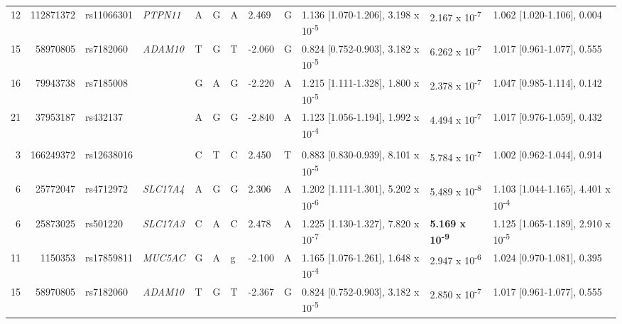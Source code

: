\documentclass[twoside,openright]{report}
\begin{document}
\begin{landscape}
\begin{table}
{\begin{tabular}[t]{rrllllllllll}
\hspace{1em}12 & 112871372 & rs11066301 & \em{PTPN11} & A & G & A & 2.469 & G & 1.136 [1.070-1.206], 3.198 x 10\textsuperscript{-5} & 2.167 x 10\textsuperscript{-7} & 1.062 [1.020-1.106], 0.004\\
\hspace{1em}15 & 58970805 & rs7182060 & \em{ADAM10} & T & G & T & -2.060 & G & 0.824 [0.752-0.903], 3.182 x 10\textsuperscript{-5} & 6.262 x 10\textsuperscript{-7} & 1.017 [0.961-1.077], 0.555\\
\hspace{1em}16 & 79943738 & rs7185008 & \em{} & G & A & G & -2.220 & A & 1.215 [1.111-1.328], 1.800 x 10\textsuperscript{-5} & 2.378 x 10\textsuperscript{-7} & 1.047 [0.985-1.114], 0.142\\
\hspace{1em}21 & 37953187 & rs432137 & \em{} & A & G & G & -2.840 & A & 1.123 [1.056-1.194], 1.992 x 10\textsuperscript{-4} & 4.494 x 10\textsuperscript{-7} & 1.017 [0.976-1.059], 0.432\\
\addlinespace[0.3em]
\multicolumn{12}{l}{\textbf{nSL}}\\
\hspace{1em}3 & 166249372 & rs12638016 & \em{} & C & T & C & 2.450 & T & 0.883 [0.830-0.939], 8.101 x 10\textsuperscript{-5} & 5.784 x 10\textsuperscript{-7} & 1.002 [0.962-1.044], 0.914\\
\hspace{1em}6 & 25772047 & rs4712972 & \em{SLC17A4} & A & G & G & 2.306 & A & 1.202 [1.111-1.301], 5.202 x 10\textsuperscript{-6} & 5.489 x 10\textsuperscript{-8} & 1.103 [1.044-1.165], 4.401 x 10\textsuperscript{-4}\\
\hspace{1em}6 & 25873025 & rs501220 & \em{SLC17A3} & C & A & C & 2.478 & A & 1.225 [1.130-1.327], 7.820 x 10\textsuperscript{-7} & \textbf{5.169 x 10\textsuperscript{-9}} & 1.125 [1.065-1.189], 2.910 x 10\textsuperscript{-5}\\
\hspace{1em}11 & 1150353 & rs17859811 & \em{MUC5AC} & G & A & g & -2.100 & A & 1.165 [1.076-1.261], 1.648 x 10\textsuperscript{-4} & 2.947 x 10\textsuperscript{-6} & 1.024 [0.970-1.081], 0.395\\
\hspace{1em}15 & 58970805 & rs7182060 & \em{ADAM10} & T & G & T & -2.367 & G & 0.824 [0.752-0.903], 3.182 x 10\textsuperscript{-5} & 2.850 x 10\textsuperscript{-7} & 1.017 [0.961-1.077], 0.555\\

\end{tabular}}
\end{table}
\end{landscape}
\end{document}
